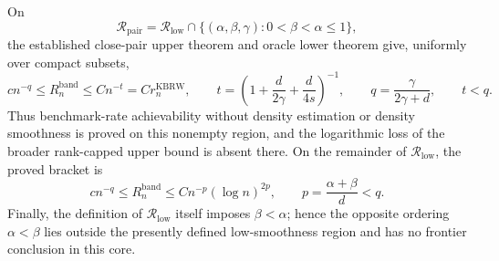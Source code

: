 On
\[
\mathcal R_{\mathrm{pair}}
=\mathcal R_{\mathrm{low}}\cap
\{(\alpha,\beta,\gamma):0<\beta<\alpha\leq1\},
\]
the established close-pair upper theorem and oracle lower theorem give,
uniformly over compact subsets,
\[
c n^{-q}\leq R_n^{\mathrm{band}}
\leq C n^{-t}=C r_n^{\mathrm{KBRW}},
\qquad
t=\left(1+\frac d{2\gamma}+\frac d{4s}\right)^{-1},
\qquad
q=\frac{\gamma}{2\gamma+d},
\qquad t<q.
\]
Thus benchmark-rate achievability without density estimation or density
smoothness is proved on this nonempty region, and the logarithmic loss of the
broader rank-capped upper bound is absent there.  On the remainder of
\(\mathcal R_{\mathrm{low}}\), the proved bracket is
\[
c n^{-q}\leq R_n^{\mathrm{band}}
\leq Cn^{-p}(\log n)^{2p},
\qquad
p=\frac{\alpha+\beta}{d}<q.
\]
Finally, the definition of \(\mathcal R_{\mathrm{low}}\) itself imposes
\(\beta<\alpha\); hence the opposite ordering \(\alpha<\beta\) lies outside
the presently defined low-smoothness region and has no frontier conclusion in
this core.